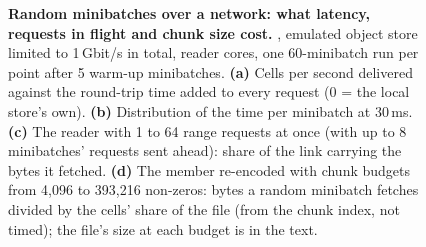 \begin{figure}[p]
\caption{\textbf{Random minibatches over a network: what latency, requests in flight and chunk size cost.}
, emulated object store limited to 1\,Gbit/s in total,  reader cores, one 60-minibatch run per
point after 5 warm-up minibatches. \textbf{(a)} Cells per second delivered against the round-trip time added to every
request (0 = the local store's own). \textbf{(b)} Distribution of the time per minibatch at 30\,ms. \textbf{(c)} The \sone{}
reader with 1 to 64 range requests at once (with up to 8 minibatches' requests sent ahead): share of the link carrying
the bytes it fetched. \textbf{(d)} The \sone{} member re-encoded with chunk budgets from 4,096 to 393,216 non-zeros: bytes
a random minibatch fetches divided by the cells' share of the file (from the chunk index, not timed); the file's size at
each budget is in the text.}
\label{fig:reads}
\end{figure}
